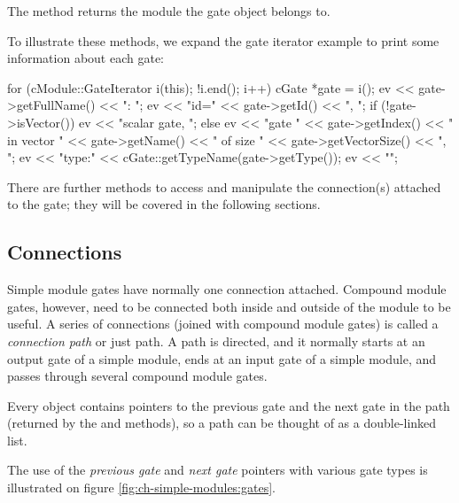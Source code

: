 The  method returns the module the gate object
belongs to.

To illustrate these methods, we expand the gate iterator example
to print some information about each gate:

\begin{cpp}
for (cModule::GateIterator i(this); !i.end(); i++) {
    cGate *gate = i();
    ev << gate->getFullName() << ": ";
    ev << "id=" << gate->getId() << ", ";
    if (!gate->isVector())
        ev << "scalar gate, ";
    else
        ev << "gate " << gate->getIndex()
           << " in vector " << gate->getName()
           << " of size " << gate->getVectorSize() << ", ";
    ev << "type:" << cGate::getTypeName(gate->getType());
    ev << "\n";
}
\end{cpp}

There are further  methods to access and manipulate
the connection(s) attached to the gate; they will be covered in the
following sections.


\subsection{Connections}
\label{sec:simple-modules:connections}

Simple module gates have normally one connection attached. Compound module
gates, however, need to be connected both inside and outside of the
module to be useful. A series of connections (joined with compound
module gates) is called a \textit{connection path} or just path.
A path is directed, and it normally starts at an output gate of
a simple module, ends at an input gate of a simple module,
and passes through several compound module gates.

Every  object contains pointers to the previous gate
and the next gate in the path (returned by the 
and  methods), so a path can be thought of as
a double-linked list.

The use of the \textit{previous gate} and \textit{next gate} pointers
with various gate types is illustrated on figure
\ref{fig:ch-simple-modules:gates}.

